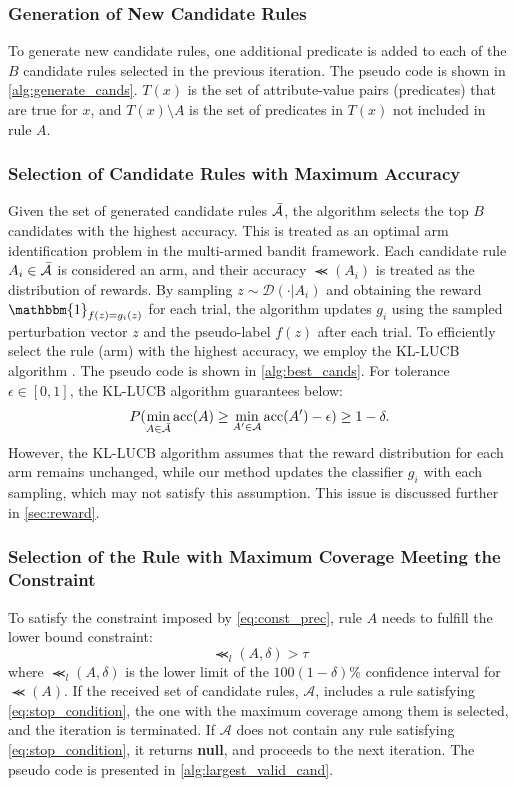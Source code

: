 \documentclass[11pt]{article}
\begin{document}
\subsubsection{Generation of New Candidate Rules}
To generate new candidate rules,
one additional predicate is added to each of the $B$ candidate rules
selected in the previous iteration.
The pseudo code is shown in \cref{alg:generate_cands}.
$T(x)$ is the set of attribute-value pairs (predicates) that are true for $x$,
and $T(x)\setminus A$ is the set of predicates in $T(x)$ not included in rule $A$.

\subsubsection{Selection of Candidate Rules with Maximum Accuracy}
Given the set of generated candidate rules $\bar{\mathcal{A}}$,
the algorithm selects the top $B$ candidates with the highest accuracy.
This is treated as an optimal arm identification problem in the multi-armed bandit framework.
Each candidate rule $A_i\in\bar{\mathcal{A}}$ is considered an arm,
and their accuracy $\Prec(A_i)$ is treated as the distribution of rewards.
By sampling $z\sim\mathcal{D}(\cdot|A_i)$
and obtaining the reward $\mathbbm{1}_{f(z)=g_i(z)}$ for each trial,
the algorithm updates $g_i$ using the sampled perturbation vector $z$
and the pseudo-label $f(z)$ after each trial.
To efficiently select the rule (arm) with the highest accuracy,
we employ the KL-LUCB algorithm \cite{kaufmann2013information}.
The pseudo code is shown in \cref{alg:best_cands}.
For tolerance $\epsilon\in[0,1]$, the KL-LUCB algorithm guarantees below:
\begin{equation}
  P(\underset{A\in\bar{\mathcal{A}}}{\min}\operatorname{acc}(A)\ge
  \underset{A'\in\mathcal{A}}{\min}\operatorname{acc}(A')-\epsilon)\ge1-\delta.
\end{equation}
However,
the KL-LUCB algorithm assumes that the reward distribution for each arm
remains unchanged,
while our method updates the classifier $g_i$ with each sampling,
which may not satisfy this assumption.
This issue is discussed further in \cref{sec:reward}.

\subsubsection{Selection of the Rule with Maximum Coverage Meeting the Constraint}
To satisfy the constraint imposed by \cref{eq:const_prec}, rule $A$ needs to fulfill the lower bound constraint:
\begin{equation}
  \Prec_{l}(A,\delta)>\tau
  \label{eq:stop_condition}
\end{equation}
where $\Prec_{l}(A,\delta)$ is the lower limit of
the $100(1-\delta)$\% confidence interval for $\Prec(A)$.
If the received set of candidate rules, $\mathcal{A}$,
includes a rule satisfying \cref{eq:stop_condition},
the one with the maximum coverage among them is selected,
and the iteration is terminated.
If $\mathcal{A}$ does not contain any rule satisfying \cref{eq:stop_condition},
it returns \textbf{null},
and proceeds to the next iteration.
The pseudo code is presented in \cref{alg:largest_valid_cand}.
\end{document}
